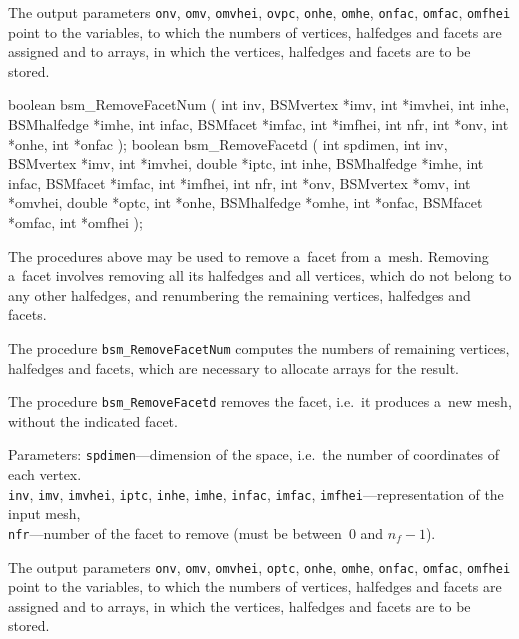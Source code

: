 The output parameters \texttt{onv}, \texttt{omv}, \texttt{omvhei},
\texttt{ovpc}, \texttt{onhe}, \texttt{omhe}, \texttt{onfac}, \texttt{omfac},
\texttt{omfhei} point to the variables, to which the numbers of vertices,
halfedges and facets are assigned and to arrays, in which the vertices,
halfedges and facets are to be stored.

\medskip
\begin{listingC}
boolean bsm_RemoveFacetNum ( int inv, BSMvertex *imv, int *imvhei,
                             int inhe, BSMhalfedge *imhe,
                             int infac, BSMfacet *imfac, int *imfhei,
                             int nfr,
                             int *onv, int *onhe, int *onfac );
boolean bsm_RemoveFacetd ( int spdimen,
                   int inv, BSMvertex *imv, int *imvhei, double *iptc,
                   int inhe, BSMhalfedge *imhe,
                   int infac, BSMfacet *imfac, int *imfhei,
                   int nfr,
                   int *onv, BSMvertex *omv, int *omvhei, double *optc,
                   int *onhe, BSMhalfedge *omhe,
                   int *onfac, BSMfacet *omfac, int *omfhei );
\end{listingC}
The procedures above may be used to remove a~facet from a~mesh.
Removing a~facet involves removing all its halfedges and all vertices, which
do not belong to any other halfedges, and renumbering the remaining
vertices, halfedges and facets.

The procedure \texttt{bsm\_RemoveFacetNum} computes the numbers of remaining
vertices, halfedges and facets, which are necessary to allocate arrays for
the result.

The procedure \texttt{bsm\_RemoveFacetd} removes the facet, i.e.\ it
produces a~new mesh, without the indicated facet.

Parameters: \texttt{spdimen}---dimension of the space, i.e.\ the number of
coordinates of each vertex. \\
\texttt{inv}, \texttt{imv}, \texttt{imvhei}, \texttt{iptc}, \texttt{inhe},
\texttt{imhe}, \texttt{infac}, \texttt{imfac},
\texttt{imfhei}---representation of the input mesh, \\
\texttt{nfr}---number of the facet to remove (must be between~$0$ and
$n_f-1$).

The output parameters \texttt{onv}, \texttt{omv}, \texttt{omvhei},
\texttt{optc}, \texttt{onhe}, \texttt{omhe}, \texttt{onfac}, \texttt{omfac},
\texttt{omfhei} point to the variables, to which the numbers of vertices,
halfedges and facets are assigned and to arrays, in which the vertices,
halfedges and facets are to be stored.



